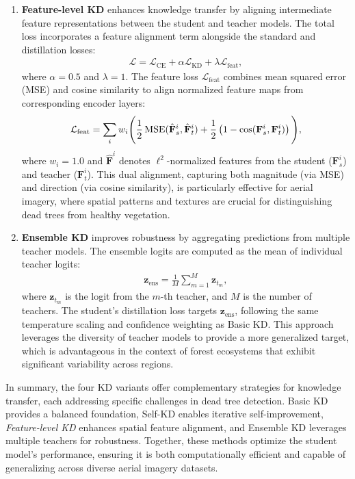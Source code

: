 \documentclass[twocolumn]{article}
\begin{document}
\begin{enumerate}
\item\textbf{Feature-level KD} enhances knowledge transfer by aligning intermediate feature representations between the student and teacher models. The total loss incorporates a feature alignment term alongside the standard and distillation losses:
\begin{align}
\mathcal{L} = \mathcal{L}_{\text{CE}} + \alpha \mathcal{L}_{\text{KD}} + \lambda \mathcal{L}_{\text{feat}},
\end{align}
where $\alpha = 0.5$ and $\lambda = 1$. The feature loss $\mathcal{L}_{\text{feat}}$ combines mean squared error (MSE) and cosine similarity to align normalized feature maps from corresponding encoder layers:
\begin{align}
\mathcal{L}_{\text{feat}} = \sum_{i} w_i \Bigg( 
    \frac{1}{2} \, \text{MSE}(\hat{\mathbf{F}}_s^i, \hat{\mathbf{F}}_t^i) 
    + \frac{1}{2} \left(1 - \cos(\mathbf{F}_s^i, \mathbf{F}_t^i)\right) 
\Bigg), \notag
\end{align}
where $w_i = 1.0$ and $\hat{\mathbf{F}}^i$ denotes $\ell^2$-normalized features from the student ($\mathbf{F}_s^i$) and teacher ($\mathbf{F}_t^i$). This dual alignment, capturing both magnitude (via MSE) and direction (via cosine similarity), is particularly effective for aerial imagery, where spatial patterns and textures are crucial for distinguishing dead trees from healthy vegetation.

\item\textbf{Ensemble KD} improves robustness by aggregating predictions from multiple teacher models. The ensemble logits are computed as the mean of individual teacher logits:
\begin{align}
\mathbf{z}_{\text{ens}} = \frac{1}{M} \sum_{m=1}^{M} \mathbf{z}_{t_m},
\end{align}
where $\mathbf{z}_{t_m}$ is the logit from the $m$-th teacher, and $M$ is the number of teachers. The student's distillation loss targets $\mathbf{z}_{\text{ens}}$, following the same temperature scaling and confidence weighting as Basic KD. This approach leverages the diversity of teacher models to provide a more generalized target, which is advantageous in the context of forest ecosystems that exhibit significant variability across regions.
\end{enumerate}

In summary, the four KD variants offer complementary strategies for knowledge transfer, each addressing specific challenges in dead tree detection. Basic KD provides a balanced foundation, Self-KD enables iterative self-improvement, \textit{Feature-level KD} enhances spatial feature alignment, and Ensemble KD leverages multiple teachers for robustness. Together, these methods optimize the student model's performance, ensuring it is both computationally efficient and capable of generalizing across diverse aerial imagery datasets.
\end{document}
